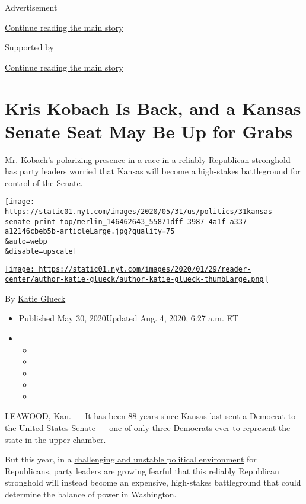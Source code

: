Advertisement

\protect\hyperlink{after-top}{Continue reading the main story}

Supported by

\protect\hyperlink{after-sponsor}{Continue reading the main story}

\hypertarget{kris-kobach-is-back-and-a-kansas-senate-seat-may-be-up-for-grabs}{%
\section{Kris Kobach Is Back, and a Kansas Senate Seat May Be Up for
Grabs}\label{kris-kobach-is-back-and-a-kansas-senate-seat-may-be-up-for-grabs}}

Mr. Kobach's polarizing presence in a race in a reliably Republican
stronghold has party leaders worried that Kansas will become a
high-stakes battleground for control of the Senate.

\texttt{[image: https://static01.nyt.com/images/2020/05/31/us/politics/31kansas-senate-print-top/merlin\_146462643\_55871dff-3987-4a1f-a337-a12146cbeb5b-articleLarge.jpg?quality=75\\\&auto=webp\\\&disable=upscale]}

\href{https://www.nytimes.com/by/katie-glueck}{\texttt{[image: https://static01.nyt.com/images/2020/01/29/reader-center/author-katie-glueck/author-katie-glueck-thumbLarge.png]}}

By \href{https://www.nytimes.com/by/katie-glueck}{Katie Glueck}

\begin{itemize}
\item
  Published May 30, 2020Updated Aug. 4, 2020, 6:27 a.m. ET
\item
  \begin{itemize}
  \item
  \item
  \item
  \item
  \item
  \end{itemize}
\end{itemize}

LEAWOOD, Kan. --- It has been 88 years since Kansas last sent a Democrat
to the United States Senate --- one of only three
\href{http://www.senate.gov/states/KS/senators.htm}{Democrats ever} to
represent the state in the upper chamber.

But this year, in a
\href{https://www.nytimes.com/2020/04/25/us/politics/trump-election-briefings.html}{challenging
and unstable political environment} for Republicans, party leaders are
growing fearful that this reliably Republican stronghold will instead
become an expensive, high-stakes battleground that could determine the
balance of power in Washington.

